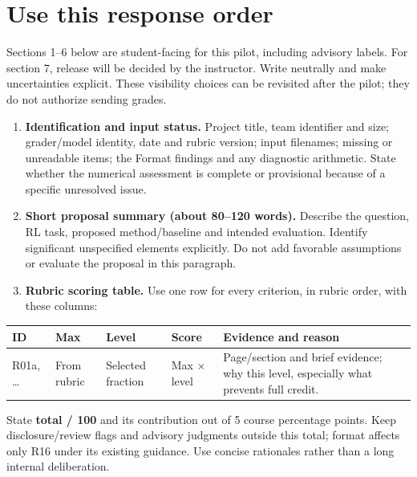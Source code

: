 \documentclass{article}
\begin{document}
\section*{Use this response order}
Sections 1--6 below are student-facing for this pilot, including advisory labels. For section 7, release will be decided by the instructor. Write neutrally and make uncertainties explicit. These visibility choices can be revisited after the pilot; they do not authorize sending grades.
\begin{enumerate}
\item \textbf{Identification and input status.} Project title, team identifier and size; grader/model identity, date and rubric version; input filenames; missing or unreadable items; the Format findings and any diagnostic arithmetic. State whether the numerical assessment is complete or provisional because of a specific unresolved issue.
\item \textbf{Short proposal summary (about 80--120 words).} Describe the question, RL task, proposed method/baseline and intended evaluation. Identify significant unspecified elements explicitly. Do not add favorable assumptions or evaluate the proposal in this paragraph.
\item \textbf{Rubric scoring table.} Use one row for every criterion, in rubric order, with these columns:
\end{enumerate}
\begin{center}
\small
\begin{tabularx}{\linewidth}{@{}p{1.3cm}p{1.3cm}p{1.4cm}p{1.4cm}L@{}}
\textbf{ID} & \textbf{Max} & \textbf{Level} & \textbf{Score} & \textbf{Evidence and reason}\\\hline
R01a, \ldots & From rubric & Selected fraction & Max $\times$ level & Page/section and brief evidence; why this level, especially what prevents full credit.\\
\end{tabularx}
\end{center}
\noindent State \textbf{total / 100} and its contribution out of 5 course percentage points. Keep disclosure/review flags and advisory judgments outside this total; format affects only R16 under its existing guidance. Use concise rationales rather than a long internal deliberation.
\end{document}
